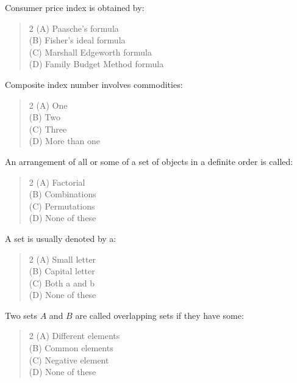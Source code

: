 \documentclass[11pt,a4paper]{article}
\begin{document}
\begin{mcqlist}
\item Consumer price index is obtained by:
\begin{quote}\begin{multicols}{2}
\noindent (A) Paasche's formula \\
(B) Fisher's ideal formula \\
(C) Marshall Edgeworth formula \\
(D) Family Budget Method formula
\end{multicols}\end{quote}

\item Composite index number involves commodities:
\begin{quote}\begin{multicols}{2}
\noindent (A) One \\
(B) Two \\
(C) Three \\
(D) More than one
\end{multicols}\end{quote}

\item An arrangement of all or some of a set of objects in a definite order is called:
\begin{quote}\begin{multicols}{2}
\noindent (A) Factorial \\
(B) Combinations \\
(C) Permutations \\
(D) None of these
\end{multicols}\end{quote}

\item A set is usually denoted by a:
\begin{quote}\begin{multicols}{2}
\noindent (A) Small letter \\
(B) Capital letter \\
(C) Both a and b \\
(D) None of these
\end{multicols}\end{quote}

\item Two sets $A$ and $B$ are called overlapping sets if they have some:
\begin{quote}\begin{multicols}{2}
\noindent (A) Different elements \\
(B) Common elements \\
(C) Negative element \\
(D) None of these
\end{multicols}\end{quote}


\end{mcqlist}
\end{document}

